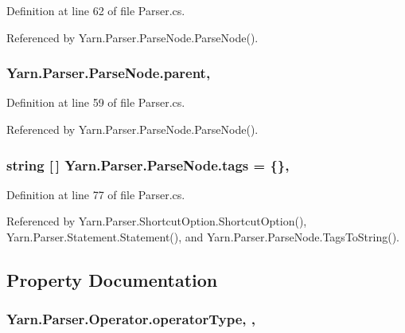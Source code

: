 Definition at line 62 of file Parser.\-cs.



Referenced by Yarn.\-Parser.\-Parse\-Node.\-Parse\-Node().

\hypertarget{a00150_af313a82103fcc2ff5a177dbb06b92f7b}{
\subsubsection[{parent}]{ Yarn.\-Parser.\-Parse\-Node.\-parent\hspace{0.3cm}{\ttfamily [package]}, {\ttfamily [inherited]}}}\label{a00150_af313a82103fcc2ff5a177dbb06b92f7b}


Definition at line 59 of file Parser.\-cs.



Referenced by Yarn.\-Parser.\-Parse\-Node.\-Parse\-Node().

\hypertarget{a00150_a58b3a15788fd2d4127d73619dc6d04ae}{
\subsubsection[{tags}]{\setlength{\rightskip}{0pt plus 5cm}string \mbox{[}$\,$\mbox{]} Yarn.\-Parser.\-Parse\-Node.\-tags = \{\}\hspace{0.3cm}{\ttfamily [package]}, {\ttfamily [inherited]}}}\label{a00150_a58b3a15788fd2d4127d73619dc6d04ae}


Definition at line 77 of file Parser.\-cs.



Referenced by Yarn.\-Parser.\-Shortcut\-Option.\-Shortcut\-Option(), Yarn.\-Parser.\-Statement.\-Statement(), and Yarn.\-Parser.\-Parse\-Node.\-Tags\-To\-String().



\subsection{Property Documentation}
\hypertarget{a00145_ac2de2f59be0e69b316627a4de16fadd3}{
\subsubsection[{operator\-Type}]{ Yarn.\-Parser.\-Operator.\-operator\-Type\hspace{0.3cm}{\ttfamily [get]}, {\ttfamily [set]}, {\ttfamily [package]}}}\label{a00145_ac2de2f59be0e69b316627a4de16fadd3}


